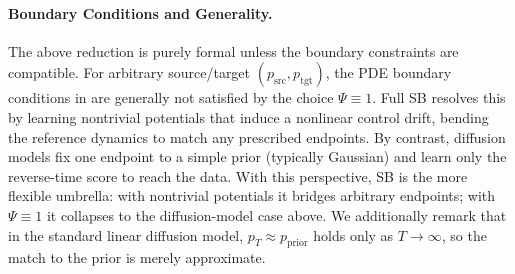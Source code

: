 \paragraph{Boundary Conditions and Generality.}
The above reduction is purely formal unless the boundary constraints are compatible. For arbitrary
source/target $(p_{\mathrm{src}},p_{\mathrm{tgt}})$, the PDE boundary conditions in
 are generally not satisfied by the choice $\Psi\equiv 1$.
Full SB resolves this by learning nontrivial potentials that induce a nonlinear control
drift, bending the reference dynamics to match any prescribed endpoints. By contrast,
diffusion models fix one endpoint to a simple prior (typically Gaussian) and learn only the
reverse-time score to reach the data. With this perspective, SB is the more flexible umbrella: with nontrivial
potentials it bridges arbitrary endpoints; with $\Psi\equiv 1$ it collapses to the diffusion-model
case above. We additionally remark that in the standard linear diffusion model, $p_T \approx p_{\mathrm{prior}}$ holds only as $T \to \infty$, so the match to the prior is merely approximate.







